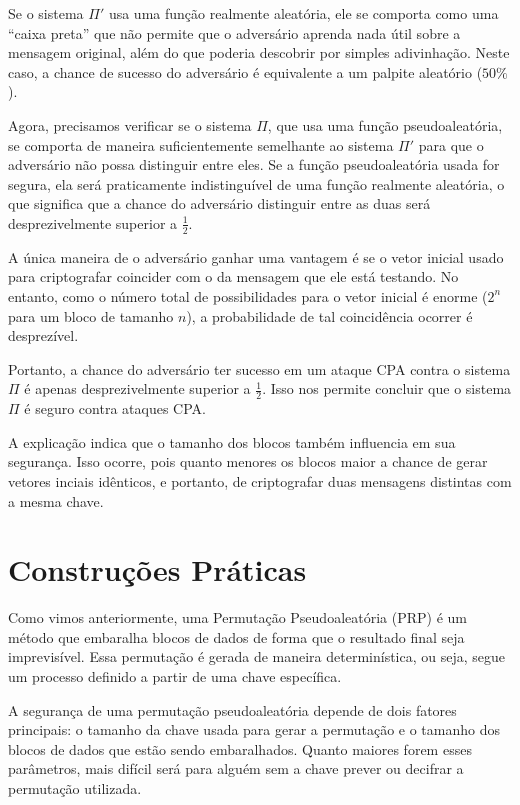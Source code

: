 Se o sistema $\Pi'$ usa uma função realmente aleatória, ele se comporta como uma ``caixa preta'' que não permite que o adversário aprenda nada útil sobre a mensagem original, além do que poderia descobrir por simples adivinhação.
Neste caso, a chance de sucesso do adversário é equivalente a um palpite aleatório ($50\%$).

Agora, precisamos verificar se o sistema $\Pi$, que usa uma função pseudoaleatória, se comporta de maneira suficientemente semelhante ao sistema $\Pi'$ para que o adversário não possa distinguir entre eles.
Se a função pseudoaleatória usada for segura, ela será praticamente indistinguível de uma função realmente aleatória, o que significa que a chance do adversário distinguir entre as duas será desprezivelmente superior a $\frac{1}{2}$.

A única maneira de o adversário ganhar uma vantagem é se o vetor inicial usado para criptografar coincider com o da mensagem que ele está testando.
No entanto, como o número total de possibilidades para o vetor inicial é enorme ($2^n$ para um bloco de tamanho $n$), a probabilidade de tal coincidência ocorrer é desprezível.

Portanto, a chance do adversário ter sucesso em um ataque CPA contra o sistema $\Pi$ é apenas desprezivelmente superior a $\frac{1}{2}$.
Isso nos permite concluir que o sistema $\Pi$ é seguro contra ataques CPA.

A explicação indica que o tamanho dos blocos também influencia em sua segurança.
Isso ocorre, pois quanto menores os blocos maior a chance de gerar vetores inciais idênticos, e portanto, de criptografar duas mensagens distintas com a mesma chave.

\section{Construções Práticas}
\label{sec:construcoes-praticas}

Como vimos anteriormente, uma Permutação Pseudoaleatória (PRP) é um método que embaralha blocos de dados de forma que o resultado final seja imprevisível.
Essa permutação é gerada de maneira determinística, ou seja, segue um processo definido a partir de uma chave específica.

A segurança de uma permutação pseudoaleatória depende de dois fatores principais:
o tamanho da chave usada para gerar a permutação e o tamanho dos blocos de dados que estão sendo embaralhados.
Quanto maiores forem esses parâmetros, mais difícil será para alguém sem a chave prever ou decifrar a permutação utilizada.

